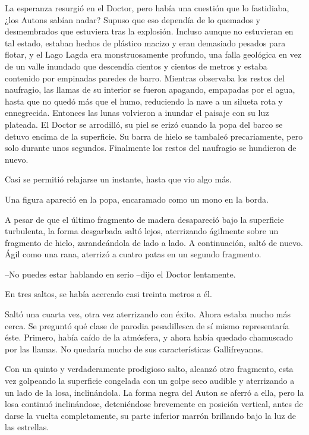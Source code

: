 La esperanza resurgió en el Doctor, pero había una cuestión que lo fastidiaba, ¿los Autons sabían nadar? Supuso que eso dependía de lo quemados y desmembrados que estuviera tras la explosión. Incluso aunque no estuvieran en tal estado, estaban hechos de plástico macizo y eran demasiado pesados para flotar, y el Lago Lagda era monstruosamente profundo, una falla geológica en vez de un valle inundado que descendía cientos y cientos de metros y estaba contenido por empinadas paredes de barro. Mientras observaba los restos del naufragio, las llamas de su interior se fueron apagando, empapadas por el agua, hasta que no quedó más que el humo, reduciendo la nave a un silueta rota y ennegrecida. Entonces las lunas volvieron a inundar el paisaje con su luz plateada. El Doctor se arrodilló, su piel se erizó cuando la popa del barco se detuvo encima de la superficie. Su barra de hielo se tambaleó precariamente, pero solo durante unos segundos. Finalmente los restos del naufragio se hundieron de nuevo.
 
Casi se permitió relajarse un instante, hasta que vio algo más.
 
Una figura apareció en la popa, encaramado como un mono en la borda.
 
A pesar de que el último fragmento de madera desapareció bajo la superficie turbulenta, la forma desgarbada saltó lejos, aterrizando ágilmente sobre un fragmento de hielo, zarandeándola de lado a lado. A continuación, saltó de nuevo. Ágil como una rana, aterrizó a cuatro patas en un segundo fragmento.
 
--No puedes estar hablando en serio --dijo el Doctor lentamente.
 
En tres saltos, se había acercado casi treinta metros a él.
 
Saltó una cuarta vez, otra vez aterrizando con éxito. Ahora estaba mucho más cerca. Se preguntó qué clase de parodia pesadillesca de sí mismo representaría éste. Primero, había caído de la atmósfera, y ahora había quedado chamuscado por las llamas. No quedaría mucho de sus características Gallifreyanas.
 
Con un quinto y verdaderamente prodigioso salto, alcanzó otro fragmento, esta vez golpeando la superficie congelada con un golpe seco audible y aterrizando a un lado de la losa, inclinándola. La forma negra del Auton se aferró a ella, pero la losa continuó inclinándose, deteniéndose brevemente en posición vertical, antes de darse la vuelta completamente, su parte inferior marrón brillando bajo la luz de las estrellas.
 
